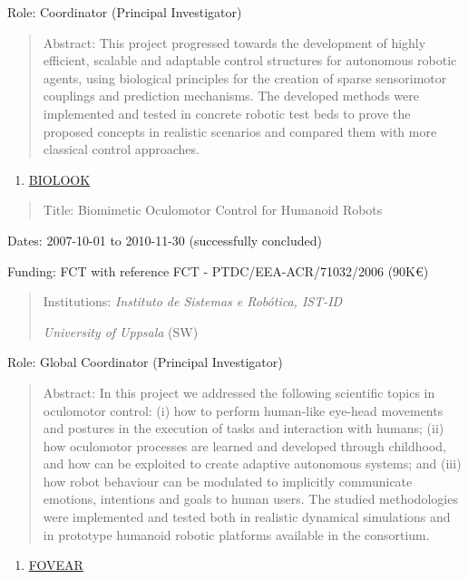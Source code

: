 Role: Coordinator (Principal Investigator)

\begin{quote}
Abstract: This project progressed towards the development of highly
efficient, scalable and adaptable control structures for autonomous
robotic agents, using biological principles for the creation of sparse
sensorimotor couplings and prediction mechanisms. The developed methods
were implemented and tested in concrete robotic test beds to prove the
proposed concepts in realistic scenarios and compared them with more
classical control approaches.
\end{quote}

\begin{enumerate}
\def\labelenumi{\arabic{enumi}.}
\setcounter{enumi}{6}
\item
  \ul{BIOLOOK}
\end{enumerate}

\begin{quote}
Title: Biomimetic Oculomotor Control for Humanoid Robots
\end{quote}

Dates: 2007-10-01 to 2010-11-30 (successfully concluded)

Funding: FCT with reference FCT - PTDC/EEA-ACR/71032/2006 (90K€)

\begin{quote}
Institutions: \emph{Instituto de Sistemas e Robótica, IST-ID}

\emph{University of Uppsala} (SW)
\end{quote}

Role: Global Coordinator (Principal Investigator)

\begin{quote}
Abstract: In this project we addressed the following scientific topics
in oculomotor control: (i) how to perform human-like eye-head movements
and postures in the execution of tasks and interaction with humans; (ii)
how oculomotor processes are learned and developed through childhood,
and how can be exploited to create adaptive autonomous systems; and
(iii) how robot behaviour can be modulated to implicitly communicate
emotions, intentions and goals to human users. The studied methodologies
were implemented and tested both in realistic dynamical simulations and
in prototype humanoid robotic platforms available in the consortium.
\end{quote}

\begin{enumerate}
\def\labelenumi{\arabic{enumi}.}
\setcounter{enumi}{7}
\item
  \ul{FOVEAR}
\end{enumerate}

